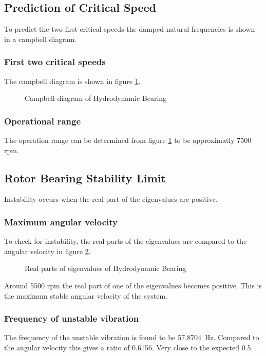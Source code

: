 \subsection{Prediction of Critical Speed}
To predict the two first critical speeds the damped natural frequencies is shown in a campbell diagram.

\subsubsection{First two critical speeds}
The campbell diagram is shown in figure \ref{fig:hydrodynamic_bearing_campbell}.
\begin{figure}[ht]
    \centering
    
    \caption{Campbell diagram of Hydrodynamic Bearing}
    \label{fig:hydrodynamic_bearing_campbell}
\end{figure}


\subsubsection{Operational range}
The operation range can be determined from figure \ref{fig:hydrodynamic_bearing_campbell} to be approximatly 7500 rpm.

\subsection{Rotor Bearing Stability Limit}
Instability occurs when the real part of the eigenvalues are positive.

\subsubsection{Maximum angular velocity}
To check for instability, the real parts of the eigenvalues are compared to the angular velocity in figure \ref{fig:hydrodynamic_bearing_eigenvalues}.
\begin{figure}[ht]
    \centering
    
    \caption{Real parts of eigenvalues of Hydrodynamic Bearing}
    \label{fig:hydrodynamic_bearing_eigenvalues}
\end{figure}
Around 5500 rpm the real part of one of the eigenvalues becomes positive. This is the maximum stable angular velocity of the system.

\subsubsection{Frequency of unstable vibration}
The frequency of the unstable vibration is found to be \SI{57.8704}{\hertz}. Compared to the angular velocity this gives a ratio of 0.6156. Very close to the expected 0.5.

